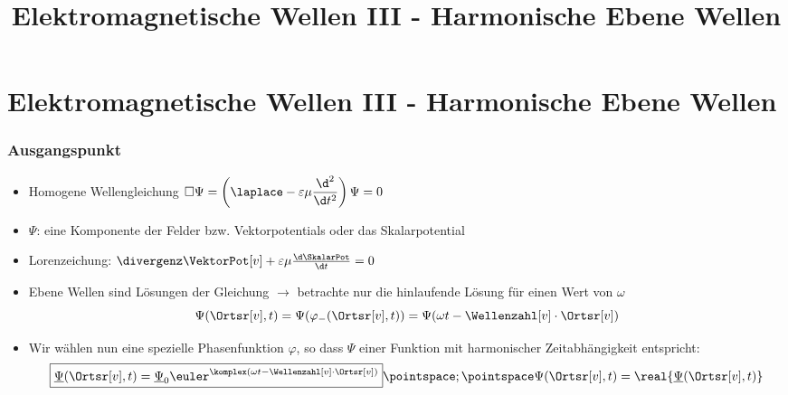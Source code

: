 
  
\title[TET: Elektromagnetische Wellen III - Harmonische Ebene Wellen]{Elektromagnetische Wellen III - Harmonische Ebene Wellen}


% 
% 

\maketitle

% 
% 
\section{Elektromagnetische Wellen III - Harmonische Ebene Wellen}

\begin{frame}
  \frametitle{Ausgangspunkt}
  \begin{itemize}[<+->]
  \item \alert{Homogene} Wellengleichung \(\square\Psi = \left(\laplace - \varepsilon\mu\dfrac{\d^2}{\d t^2} \right)\Psi =0\)
  \item \(\Psi\): eine Komponente der Felder bzw. Vektorpotentials oder das Skalarpotential
  \item \alert{Lorenzeichung}: \(\divergenz\VektorPot[v] +\varepsilon\mu \frac{\d \SkalarPot}{\d t}=0 \)
  \item \alert{Ebene Wellen} sind Lösungen der Gleichung \(\to\) betrachte nur die \alert{hinlaufende} Lösung für einen Wert von \(\omega\)
    \begin{equation*}
      \Psi(\Ortsr[v], t) = \Psi(\varphi_-(\Ortsr[v], t)) = \Psi(\omega t - \Wellenzahl[v]\cdot\Ortsr[v])
    \end{equation*}
  \item Wir wählen nun eine spezielle Phasenfunktion \(\varphi\), so dass \(\Psi\) einer Funktion mit \alert{harmonischer Zeitabhängigkeit} entspricht:
    \begin{equation*}
      \boxed{\underline{\Psi}(\Ortsr[v], t) = \underline{\Psi}_0 \euler^{\komplex(\omega t -\Wellenzahl[v] \cdot \Ortsr[v])} }\pointspace ; \pointspace \Psi(\Ortsr[v], t) = \real{\underline{\Psi}(\Ortsr[v], t)}
      \end{equation*}
  \end{itemize}
\end{frame}


